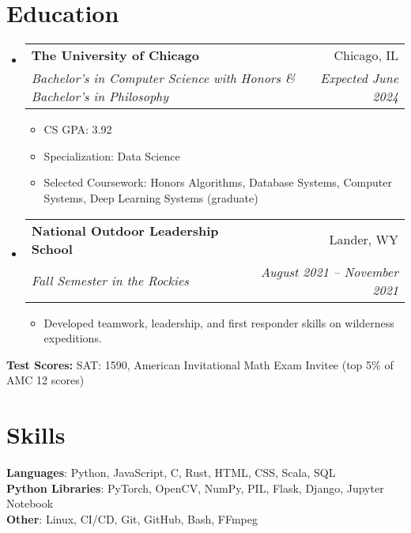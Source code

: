 \documentclass[letterpaper,11pt]{article}
\makeatletter
\newcommand{\resumeItem}[1]{
  \item\small{
    {#1 \vspace{-2pt}}
  }
}
\newcommand{\resumeSubheading}[4]{
  \vspace{-2pt}\item
    \begin{tabular*}{0.97\textwidth}[t]{l@{\extracolsep{\fill}}r}
      \textbf{#1} & #2 \\
      \textit{\small#3} & \textit{\small #4} \\
    \end{tabular*}\vspace{-7pt}
}
\newcommand{\resumeSubHeadingListStart}{\begin{itemize}[leftmargin=0.125in, label={}]}
\newcommand{\resumeSubHeadingListEnd}{\end{itemize}}
\newcommand{\resumeItemListStart}{\begin{itemize}[leftmargin=0.185in]
}
\newcommand{\resumeItemListEnd}{\end{itemize}\vspace{-5pt}}
\makeatother
\begin{document}
\section{Education}
  \resumeSubHeadingListStart
    \resumeSubheading
      {The University of Chicago}{Chicago, IL}
      {Bachelor's in Computer Science with Honors \& Bachelor's in Philosophy}{Expected June 2024}
      \resumeItemListStart
        \resumeItem{CS GPA: 3.92}
        \resumeItem{Specialization: Data Science}
        \resumeItem{{Selected Coursework:} 
        Honors Algorithms,
        Database Systems,
        Computer Systems,
        Deep Learning Systems (graduate)
        }
      \resumeItemListEnd

    \resumeSubheading
      {National Outdoor Leadership School}{Lander, WY}
      {Fall Semester in the Rockies}{August 2021 -- November 2021}
      \resumeItemListStart
        \resumeItem{Developed teamwork, leadership, and first responder skills on wilderness expeditions.}
      \resumeItemListEnd
  \resumeSubHeadingListEnd
  {
    \vspace{-5pt}
    \noindent\hspace{0.15in}\small\textbf{Test Scores:} SAT: 1590, American Invitational Math Exam Invitee (top 5\% of AMC 12 scores)
    \vspace{-5pt}
    }
\section{Skills}
  \begin{itemize}[leftmargin=0.15in, label={}]
    \small{\item{
      \textbf{Languages}{:
      Python,
      JavaScript,
      C,
      Rust,
      HTML,
      CSS,
      Scala,
      SQL} \\
      \textbf{Python Libraries}{: 
      PyTorch,
      OpenCV,
      NumPy,
      PIL,
      Flask,
      Django,
      Jupyter Notebook
      } 
      \\
      \textbf{Other}{:
        Linux,
        CI/CD,
        Git, 
        GitHub,
        Bash,
        FFmpeg
        }}}
      {\vspace{-5pt}}
  \end{itemize}
\end{document}
